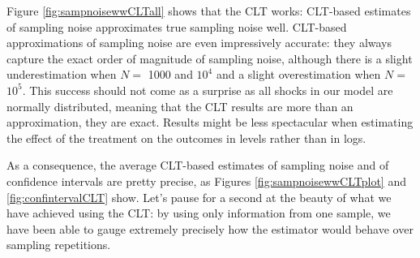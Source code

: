 \documentclass[
]{book}
\theoremstyle{definition}
\theoremstyle{definition}
\theoremstyle{definition}
\theoremstyle{definition}
\theoremstyle{remark}
\begin{document}
Figure \ref{fig:sampnoisewwCLTall} shows that the CLT works: CLT-based estimates of sampling noise approximates true sampling noise well.
CLT-based approximations of sampling noise are even impressively accurate: they always capture the exact order of magnitude of sampling noise, although there is a slight underestimation when \(N=\) 1000 and \ensuremath{10^{4}} and a slight overestimation when \(N=\) \ensuremath{10^{5}}.
This success should not come as a surprise as all shocks in our model are normally distributed, meaning that the CLT results are more than an approximation, they are exact.
Results might be less spectacular when estimating the effect of the treatment on the outcomes in levels rather than in logs.

As a consequence, the average CLT-based estimates of sampling noise and of confidence intervals are pretty precise, as Figures \ref{fig:sampnoisewwCLTplot} and \ref{fig:confintervalCLT} show.
Let's pause for a second at the beauty of what we have achieved using the CLT: by using only information from one sample, we have been able to gauge extremely precisely how the estimator would behave over sampling repetitions.
\end{document}

